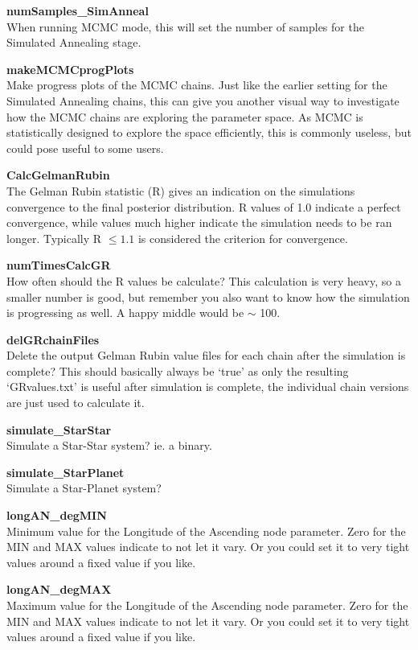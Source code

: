\documentclass[12pt,preprint]{aastex}
\begin{document}
{\bf numSamples\_SimAnneal}\\
When running MCMC mode, this will set the number of samples for the Simulated Annealing stage.

{\bf makeMCMCprogPlots}\\
Make progress plots of the MCMC chains.  Just like the earlier setting for the Simulated Annealing chains, this can give you another visual way to investigate how the MCMC chains are exploring the parameter space.  As MCMC is statistically designed to explore the space efficiently, this is commonly useless, but could pose useful to some users.

{\bf CalcGelmanRubin}\\
The Gelman Rubin statistic (R) gives an indication on the simulations convergence to the final posterior distribution.  R values of 1.0 indicate a perfect convergence, while values much higher indicate the simulation needs to be ran longer.  Typically R $\leq1.1$ is considered the criterion for convergence.

{\bf numTimesCalcGR}\\
How often should the R values be calculate?  This calculation is very heavy, so a smaller number is good, but remember you also want to know how the simulation is progressing as well.  A happy middle would be $\sim$ 100.

{\bf delGRchainFiles}\\
Delete the output Gelman Rubin value files for each chain after the simulation is complete?  This should basically always be `true' as only the resulting `GRvalues.txt' is useful after simulation is complete, the individual chain versions are just used to calculate it. 

{\bf simulate\_StarStar }\\
Simulate a Star-Star system?  ie. a binary.

{\bf simulate\_StarPlanet}\\
Simulate a Star-Planet system?

{\bf longAN\_degMIN}\\
Minimum value for the Longitude of the Ascending node parameter.
Zero for the MIN and MAX values indicate to not let it vary.  Or you could set it to very tight values around a fixed value if you like.

{\bf longAN\_degMAX}\\
Maximum value for the Longitude of the Ascending node parameter.
Zero for the MIN and MAX values indicate to not let it vary.  Or you could set it to very tight values around a fixed value if you like.
\end{document}
